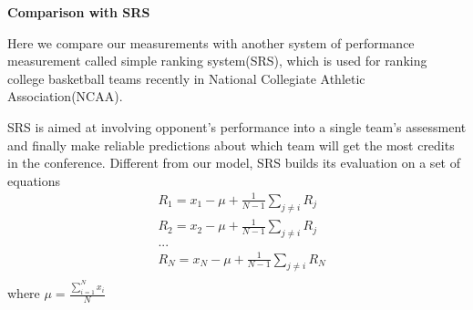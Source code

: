 



\textbf{Comparison with SRS}

Here we compare our measurements with another system of performance measurement called simple ranking system(SRS), which is used for ranking college basketball teams recently in National Collegiate Athletic Association(NCAA).

SRS is aimed at involving opponent's performance into a single team's assessment and finally make reliable predictions about which team will get the most credits in the conference. Different from our model, SRS builds its evaluation on a set of equations
\begin{align}
\nonumber
&R_1 = x_1 - \mu + \frac{1}{N-1}\sum_{j\neq i} R_j\\\nonumber
&R_2 = x_2 - \mu + \frac{1}{N-1}\sum_{j\neq i} R_j\\\nonumber
&...\\\nonumber
&R_N = x_N - \mu + \frac{1}{N-1}\sum_{j\neq i} R_N \\\nonumber
\end{align}
where $\mu = \frac{\sum_{i=1}^Nx_i}{N}$

